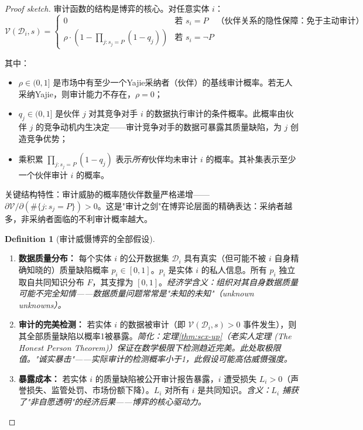 \documentclass[12pt,a4paper]{ctexart}
\theoremstyle{definition}
\newtheorem{definition}{Definition}[section]
\theoremstyle{remark}
\begin{document}
\begin{proof}[Proof sketch]
审计函数的结构是博弈的核心。对任意实体 $i$：
\begin{equation}
\mathcal{V}(\mathcal{D}_i, s) =
\begin{cases}
0 & \text{若 } s_i = P \quad \text{（伙伴关系的隐性保障：免于主动审计）}\\
\rho \cdot \left(1 - \prod_{j: s_j = P} (1 - q_j)\right) & \text{若 } s_i = \neg P
\end{cases}
\label{eq:audit-function}
\end{equation}

其中：
\begin{itemize}[itemsep=2pt]
\item $\rho \in (0, 1]$ 是市场中有至少一个Yajie采纳者（伙伴）的基线审计概率。若无人采纳Yajie，则审计能力不存在，$\rho = 0$；
\item $q_j \in (0, 1]$ 是伙伴 $j$ 对其竞争对手 $i$ 的数据执行审计的条件概率。此概率由伙伴 $j$ 的竞争动机内生决定——审计竞争对手的数据可暴露其质量缺陷，为 $j$ 创造竞争优势；
\item 乘积累 $\prod_{j: s_j = P} (1 - q_j)$ 表示\textit{所有}伙伴均未审计 $i$ 的概率。其补集表示至少一个伙伴审计 $i$ 的概率。
\end{itemize}

关键结构特性：审计威胁的概率随伙伴数量严格递增——$\partial \mathcal{V} / \partial (\#\{j: s_j = P\}) > 0$。这是"审计之剑"在博弈论层面的精确表达：采纳者越多，非采纳者面临的不利审计概率越大。

\begin{definition}[审计威慑博弈的全部假设]
\label{def:ad-assumptions}
\begin{enumerate}[label=\textbf{D\arabic*}, leftmargin=*, itemsep=4pt]
\item \textbf{数据质量分布：} 每个实体 $i$ 的公开数据集 $\mathcal{D}_i$ 具有真实（但可能不被 $i$ 自身精确知晓的）质量缺陷概率 $p_i \in [0,1]$。$p_i$ 是实体 $i$ 的私人信息。所有 $p_i$ 独立取自共同知识分布 $F$，其支撑为 $[0,1]$。\hfill\textit{经济学含义：组织对其自身数据质量可能不完全知情——数据质量问题常常是"未知的未知"（unknown unknowns）。}

\item \textbf{审计的完美检测：} 若实体 $i$ 的数据被审计（即 $\mathcal{V}(\mathcal{D}_i, s) > 0$ 事件发生），则其全部质量缺陷以概率1被暴露。\hfill\textit{简化：定理\ref{thm:scx-up}（老实人定理 (The Honest Person Theorem)）保证在数学极限下检测趋近完美。此处取极限值。"诚实暴击"——实际审计的检测概率小于1，此假设可能高估威慑强度。}

\item \textbf{暴露成本：} 若实体 $i$ 的质量缺陷被公开审计报告暴露，$i$ 遭受损失 $L_i > 0$（声誉损失、监管处罚、市场份额下降）。$L_i$ 对所有 $i$ 是共同知识。\hfill\textit{含义：$L_i$ 捕获了"非自愿透明"的经济后果——博弈的核心驱动力。}


\end{enumerate}
\end{definition}
\end{proof}
\end{document}

